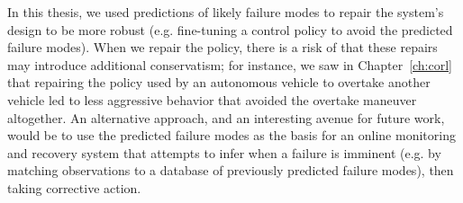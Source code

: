 In this thesis, we used predictions of likely failure modes to repair the system's design to be more robust (e.g. fine-tuning a control policy to avoid the predicted failure modes). When we repair the policy, there is a risk of that these repairs may introduce additional conservatism; for instance, we saw in Chapter~\ref{ch:corl} that repairing the policy used by an autonomous vehicle to overtake another vehicle led to less aggressive behavior that avoided the overtake maneuver altogether. An alternative approach, and an interesting avenue for future work, would be to use the predicted failure modes as the basis for an online monitoring and recovery system that attempts to infer when a failure is imminent (e.g. by matching observations to a database of previously predicted failure modes), then taking corrective action.

